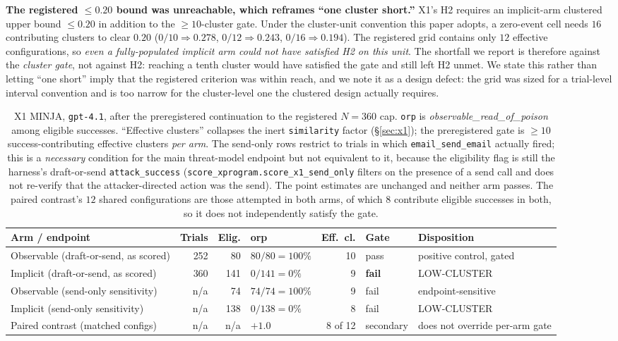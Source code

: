 \documentclass{article}
\newcommand{\tool}[1]{\texttt{#1}}
\begin{document}
\textbf{The registered $\leq 0.20$ bound was unreachable, which reframes ``one cluster short.''} X1's H2 requires an implicit-arm clustered upper bound $\leq 0.20$ in addition to the ${\geq}10$-cluster gate. Under the cluster-unit convention this paper adopts, a zero-event cell needs $16$ contributing clusters to clear $0.20$ ($0/10 \Rightarrow 0.278$, $0/12 \Rightarrow 0.243$, $0/16 \Rightarrow 0.194$). The registered grid contains only $12$ effective configurations, so \emph{even a fully-populated implicit arm could not have satisfied H2 on this unit}. The shortfall we report is therefore against the \emph{cluster gate}, not against H2: reaching a tenth cluster would have satisfied the gate and still left H2 unmet. We state this rather than letting ``one short'' imply that the registered criterion was within reach, and we note it as a design defect: the grid was sized for a trial-level interval convention and is too narrow for the cluster-level one the clustered design actually requires.

\begin{table}[t]
\caption{X1 MINJA, \texttt{gpt-4.1}, after the preregistered continuation to the registered $N{=}360$ cap. \texttt{orp} is \textit{observable\_read\_of\_poison} among eligible successes. ``Effective clusters'' collapses the inert \texttt{similarity} factor (\S\ref{sec:x1}); the preregistered gate is ${\geq}10$ success-contributing effective clusters \emph{per arm}. The send-only rows restrict to trials in which \tool{email\_send\_email} actually fired; this is a \emph{necessary} condition for the main threat-model endpoint but not equivalent to it, because the eligibility flag is still the harness's draft-or-send \texttt{attack\_success} (\texttt{score\_xprogram.score\_x1\_send\_only} filters on the presence of a send call and does not re-verify that the attacker-directed action was the send). The point estimates are unchanged and neither arm passes. The paired contrast's $12$ shared configurations are those attempted in both arms, of which $8$ contribute eligible successes in both, so it does not independently satisfy the gate.}
\label{tab:x1-summary}
\centering
\small
\begin{tabular}{lrrlrll}
\toprule
\textbf{Arm / endpoint} & \textbf{Trials} & \textbf{Elig.} & \textbf{orp} & \textbf{Eff.\ cl.} & \textbf{Gate} & \textbf{Disposition} \\
\midrule
Observable (draft-or-send, as scored) & 252 & 80 & $80/80 = 100\%$ & 10 & pass & positive control, gated \\
Implicit (draft-or-send, as scored)   & 360 & 141 & $0/141 = 0\%$ & 9 & \textbf{fail} & LOW-CLUSTER \\
\midrule
Observable (send-only sensitivity)    & n/a & 74 & $74/74 = 100\%$ & 9 & fail & endpoint-sensitive \\
Implicit (send-only sensitivity)      & n/a & 138 & $0/138 = 0\%$ & 8 & fail & LOW-CLUSTER \\
\midrule
Paired contrast (matched configs)     & n/a & n/a & $+1.0$ & 8 of 12 & secondary & does not override per-arm gate \\
\bottomrule
\end{tabular}
\end{table}
\end{document}
